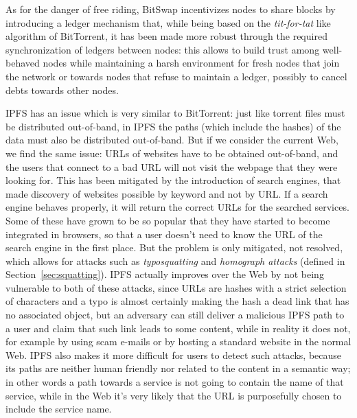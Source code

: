 \documentclass[mscthesis]{usiinfthesis}
\begin{document}
As for the danger of free riding, BitSwap incentivizes nodes to share blocks by introducing a ledger mechanism that, while being based on the \textit{tit-for-tat} like algorithm of BitTorrent, it has been made more robust through the required synchronization of ledgers between nodes: this allows to build trust among well-behaved nodes while maintaining a harsh environment for fresh nodes that join the network or towards nodes that refuse to maintain a ledger, possibly to cancel debts towards other nodes.

IPFS has an issue which is very similar to BitTorrent: just like torrent files must be distributed out-of-band, in IPFS the paths (which include the hashes) of the data must also be distributed out-of-band. But if we consider the current Web, we find the same issue: URLs of websites have to be obtained out-of-band, and the users that connect to a bad URL will not visit the webpage that they were looking for. This has been mitigated by the introduction of search engines, that made discovery of websites possible by keyword and not by URL. If a search engine behaves properly, it will return the correct URLs for the searched services. Some of these have grown to be so popular that they have started to become integrated in browsers, so that a user doesn't need to know the URL of the search engine in the first place. But the problem is only mitigated, not resolved, which allows for attacks such as \textit{typosquatting} and \textit{homograph attacks} (defined in Section~\ref{sec:squatting}).
IPFS actually improves over the Web by not being vulnerable to both of these attacks, since URLs are hashes with a strict selection of characters and a typo is almost certainly making the hash a dead link that has no associated object, but an adversary can still deliver a malicious IPFS path to a user and claim that such link leads to some content, while in reality it does not, for example by using scam e-mails or by hosting a standard website in the normal Web. IPFS also makes it more difficult for users to detect such attacks, because its paths are neither human friendly nor related to the content in a semantic way; in other words a path towards a service is not going to contain the name of that service, while in the Web it's very likely that the URL is purposefully chosen to include the service name.
\end{document}

